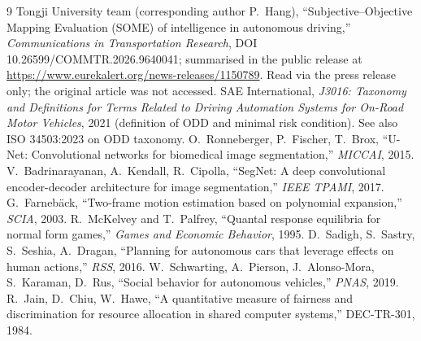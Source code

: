 \documentclass[11pt,a4paper]{article}
\begin{document}
\begin{thebibliography}{9}\small
{} Tongji University team (corresponding author P.~Hang), ``Subjective--Objective Mapping Evaluation (SOME) of intelligence in autonomous driving,'' \emph{Communications in Transportation Research}, DOI 10.26599/COMMTR.2026.9640041; summarised in the public release at \url{https://www.eurekalert.org/news-releases/1150789}. Read via the press release only; the original article was not accessed.
 SAE International, \emph{J3016: Taxonomy and Definitions for Terms Related to Driving Automation Systems for On-Road Motor Vehicles}, 2021 (definition of ODD and minimal risk condition). See also ISO 34503:2023 on ODD taxonomy.
 O.~Ronneberger, P.~Fischer, T.~Brox, ``U-Net: Convolutional networks for biomedical image segmentation,'' \emph{MICCAI}, 2015.
 V.~Badrinarayanan, A.~Kendall, R.~Cipolla, ``SegNet: A deep convolutional encoder-decoder architecture for image segmentation,'' \emph{IEEE TPAMI}, 2017.
 G.~Farneb\"ack, ``Two-frame motion estimation based on polynomial expansion,'' \emph{SCIA}, 2003.
 R.~McKelvey and T.~Palfrey, ``Quantal response equilibria for normal form games,'' \emph{Games and Economic Behavior}, 1995.
 D.~Sadigh, S.~Sastry, S.~Seshia, A.~Dragan, ``Planning for autonomous cars that leverage effects on human actions,'' \emph{RSS}, 2016.
 W.~Schwarting, A.~Pierson, J.~Alonso-Mora, S.~Karaman, D.~Rus, ``Social behavior for autonomous vehicles,'' \emph{PNAS}, 2019.
 R.~Jain, D.~Chiu, W.~Hawe, ``A quantitative measure of fairness and discrimination for resource allocation in shared computer systems,'' DEC-TR-301, 1984.
\end{thebibliography}
\end{document}
